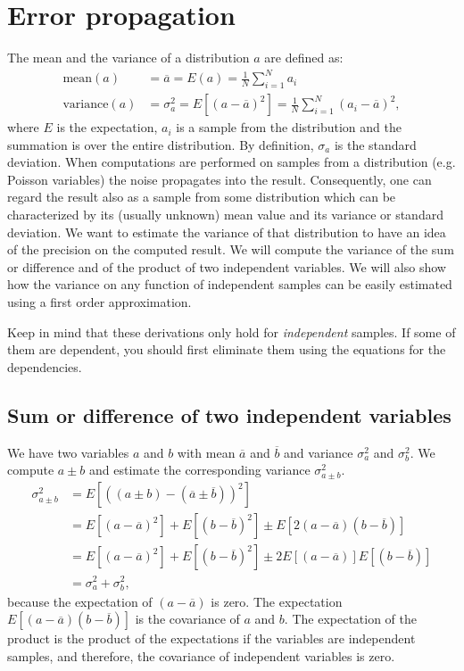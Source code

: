\newpage
\section{Error propagation} \label{app:error}
The mean and the variance of a distribution $a$ are defined as:
\begin{align}
  \mbox{mean}(a) &= \overline{a} = E(a) = \frac{1}{N} \sum_{i=1}^N a_i\\
  \mbox{variance}(a) &= \sigma_a^2 = E\left[ (a - \overline{a})^2 \right]
   = \frac{1}{N} \sum_{i=1}^N (a_i - \overline{a})^2,
\end{align}
where $E$ is the expectation, $a_i$ is a sample from the distribution and the
summation is over the entire distribution. By definition, $\sigma_a$ is the
standard deviation. When computations are performed on samples from a
distribution (e.g. Poisson variables) the noise propagates into the
result. Consequently, one can regard the result also as a sample from some
distribution which can be characterized by its (usually unknown) mean value
and its variance or standard deviation. We want to estimate the variance of
that distribution to have an idea of the precision on the computed result. We
will compute the variance of the sum or difference and of the product of two
independent variables. We will also show how the variance on any function of
independent samples can be easily estimated using a first order approximation.

Keep in mind that these derivations only hold for {\em independent}
samples. If some of them are dependent, you should first eliminate them using
the equations for the dependencies.

\subsection{Sum or difference of two independent variables}
We have two variables $a$ and $b$ with mean $\overline{a}$ and $\overline{b}$
and variance $\sigma_a^2$ and $\sigma_b^2$. We compute $a \pm b$ and estimate
the corresponding variance $\sigma_{a \pm b}^2$.
\begin{align}
\sigma_{a \pm b}^2 &= E\left[\left((a \pm b) - (\overline{a} \pm \overline{b}) \right)^2\right]
           \nonumber\\
 &= E\left[(a-\overline{a})^2\right] + E\left[(b-\overline{b})^2\right] \pm E\left[2(a-\overline{a})(b-\overline{b})\right]
           \nonumber\\
 &= E\left[(a-\overline{a})^2\right] + E\left[(b-\overline{b})^2\right] \pm 2 E\left[(a-\overline{a})\right]E\left[(b-\overline{b})\right]
           \nonumber\\
 &= \sigma_a^2 + \sigma_b^2, \label{eq:app_sumerror}
\end{align}
because the expectation of $(a - \overline{a})$ is zero. The expectation
$E\left[(a-\overline{a})(b-\overline{b})\right]$ is the covariance of $a$ and $b$. The
expectation of the product is the product of the expectations if the
variables are independent samples, and therefore, the covariance of
independent variables is zero.

